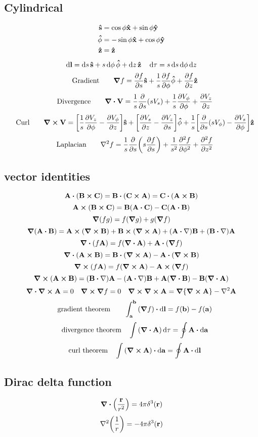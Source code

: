 \documentclass[12pt]{article}
\begin{document}
\subsection*{Cylindrical}
\begin{align*}
\vu{s}&=\cos\phi\vu{x}+\sin\phi\vu{y}\\
\vu{\phi}&=-\sin\phi\vu{x}+\cos\phi\vu{y}\\
\vu{z}&=\vu{z}
\end{align*}
\[\dd{\vb{l}}=\dd{s}\vu{\vb{s}}+s\dd{\phi}\vu{\vb{\phi}}+\dd{z}\vu{\vb{z}}\quad\dd{\tau}=s\dd{s}\dd{\phi}\dd{z}\]
\[\qq{Gradient}\quad\grad{f}=\pdv{f}{s}\vu{\vb{s}}+\frac{1}{s}\pdv{f}{\phi}\vu{\vb{\phi}}+\pdv{f}{z}\vu{\vb{z}}\]
\[\qq{Divergence}\quad\div{\vb{V}}=\frac{1}{s}\pdv{s}\qty(sV_s)+\frac{1}{s}\pdv{V_{\phi}}{\phi}+\pdv{V_z}{z}\]
\[\qq{Curl}\quad\curl{\vb{V}}=\bqty{\frac{1}{s}\pdv{V_z}{\phi}-\pdv{V_{\phi}}{z}}\vu{\vb{s}}+\bqty{\pdv{V_s}{z}-\pdv{V_z}{s}}\vu{\vb{\phi}}+\frac{1}{s}\bqty{\pdv{s}\qty(sV_{\phi})-\pdv{V_s}{\phi}}\vu{\vb{z}}\]
\[\qq{Laplacian}\quad\laplacian{f}=\frac{1}{s}\pdv{s}\qty(s\pdv{f}{s})+\frac{1}{s^2}\pdv[2]{f}{\phi}+\pdv[2]{f}{z}\]
\subsection*{vector identities}
\[\vb{A}\vdot\qty(\vb{B}\cp\vb{C})=\vb{B}\vdot\qty(\vb{C}\cp\vb{A})=\vb{C}\vdot\qty(\vb{A}\cp\vb{B})\]
\[\vb{A}\cp\qty(\vb{B}\cp\vb{C})=\vb{B}\qty(\vb{A}\vdot\vb{C})-\vb{C}\qty(\vb{A}\vdot\vb{B})\]
\[\grad{(fg)}=f(\grad{g})+g(\grad{f})\]
\[\grad{(\vb{A}\vdot\vb{B})}=\vb{A}\cp\qty(\curl{\vb{B}})+\vb{B}\cp\qty(\curl{\vb{A}})+\qty(\vb{A}\vdot\nabla)\vb{B}+\qty(\vb{B}\vdot\nabla)\vb{A}\]
\[\div{\qty(f\vb{A})}=f(\div{\vb{A}})+\vb{A}\vdot\qty(\grad{f})\]
\[\div{\qty(\vb{A}\cp\vb{B})}=\vb{B}\vdot\qty(\curl{\vb{A}})-\vb{A}\vdot\qty(\curl{\vb{B}})\]
\[\curl{\qty(f\vb{A})}=f(\curl{\vb{A}})-\vb{A}\cp\qty(\grad{f})\]
\[\curl{(\vb{A}\cp\vb{B})}=\qty(\vb{B}\vdot\nabla)\vb{A}-\qty(\vb{A}\vdot\nabla)\vb{B}+\vb{A}\qty(\div{\vb{B}})-\vb{B}\qty(\div{\vb{A}})\]
\[\div{\curl{\vb{A}}}=0\quad\curl{\grad{f}}=0\quad\curl{\curl{\vb{A}}}=\grad\qty{\curl{\vb{A}}}-\laplacian{\vb{A}}\]
\[\qq{gradient theorem}\quad \int_{\vb{a}}^{\vb{b}}\qty(\grad{f})\vdot\dd{\vb{l}}=f(\vb{b})-f(\vb{a})\]
\[\qq{divergence theorem} \int\qty(\div{\vb{A}})\dd{\tau}=\oint\vb{A}\vdot\dd{\vb{a}}\]
\[\qq{curl theorem} \int\qty(\curl{\vb{A}})\vdot\dd{\vb{a}}=\oint\vb{A}\vdot\dd{\vb{l}}\]

\subsection*{Dirac delta function}
\[\div{\qty(\frac{\vb{r}}{r^2})}=4\pi\delta^3(\vb{r})\]
\[\laplacian{\qty(\frac{1}{r})}=-4\pi\delta^3(\vb{r})\]
\end{document}
